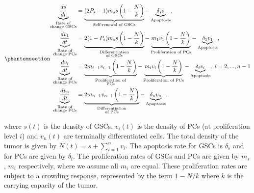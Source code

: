 \documentclass[
  default,
]{sn-jnl}
\begin{document}
\begin{equation}\phantomsection\label{eq-gsc-model}{
\begin{aligned}
  \underbrace{\frac{d s}{d t}}_{
    \substack{\text{Rate of} \\ \text{change GSCs}}} &=  \underbrace{(2P_s -1)  m_s s \left( 1 - \frac{N}{k}  \right)}_\text{Self-renewal of GSCs} - \underbrace{\delta_{s} s}_\text{Apoptosis}, \\
  \underbrace{\frac{d v_1}{d t}}_{
    \substack{\text{Rate of} \\ \text{change PCs}}} &= \underbrace{2(1- P_s)  m_s s \left( 1 - \frac{N}{k}  \right)}_{
    \substack{\text{Differentiation} \\ \text{of GSCs}}} - \underbrace{m_1 v_1 \left( 1 - \frac{N}{k} \right)}_\text{Proliferation of PCs} - \underbrace{\delta_{1} v_1}_\text{Apoptosis}, \\
  \underbrace{\frac{d v_i}{d t}}_{
    \substack{\text{Rate of} \\ \text{change PCs}}} &= \underbrace{2 m_{i-1} v_{i-1} \left( 1 - \frac{N}{k}  \right)}_{
    \substack{\text{Proliferation of} \\ \text{PCs}}} - \underbrace{m_i v_i \left( 1 - \frac{N}{k} \right)}_\text{Proliferation of PCs} - \underbrace{\delta_{i} v_i}_\text{Apoptosis}, \; i=2,...,n-1 \\
  \underbrace{\frac{d v_n}{d t}}_{
    \substack{\text{Rate of} \\ \text{change PCs}}} &= \underbrace{2 m_{n-1} v_{n-1} \left( 1 - \frac{N}{k}  \right)}_{
    \substack{\text{Differentiation} \\ \text{of PCs}}} - \underbrace{\delta_{n} v_n}_\text{Apoptosis}, \\
\end{aligned} 
}\end{equation}

where \(s(t)\) is the density of GSCs, \(v_i(t)\) is the density of PCs
(at proliferation level \(i\)) and \(v_n(t)\) are terminally
differentiated cells. The total density of the tumor is given by
\(N(t) = s + \sum_{i=1}^{n} v_i\). The apoptosis rate for GSCs is
\(\delta_s\) and for PCs are given by \(\delta_i\). The proliferation
rates of GSCs and PCs are given by \(m_s\), \(m_i\) respectively, where
we assume all \(m_i\) are equal. These proliferation rates are subject
to a crowding response, represented by the term \(1 - N/k\) where \(k\)
is the carrying capacity of the tumor.
\end{document}
